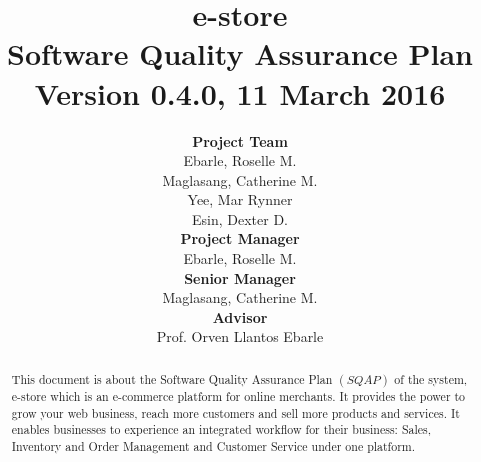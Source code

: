 \documentclass[12pt,letterpaper, margin=1in]{article}
\begin{document}
\title{\textbf{e-store}\\Software Quality Assurance Plan\\{\normalsize Version 0.4.0, 11 March 2016}\\[25pt]}
\author{
	\textbf{Project Team}\\
	Ebarle, Roselle M.\\
	Maglasang, Catherine M.\\
	Yee, Mar Rynner\\
	Esin, Dexter D.\\	[25pt]
	\textbf{Project Manager}\\
	Ebarle, Roselle M.\\[25pt]
	\textbf{Senior Manager}\\
	Maglasang, Catherine M.\\[25pt]
	\textbf{Advisor}\\
	Prof. Orven Llantos Ebarle\\[25pt]
}
\clearpage\maketitle
\thispagestyle{empty}

\newpage

\begin{abstract}
This document is about the Software Quality Assurance Plan $(SQAP)$ of the system, e-store which is an e-commerce platform for online merchants. It provides the power to grow your web business, reach more customers and sell more products and services. It enables businesses to experience an integrated workflow for their business: Sales, Inventory and Order Management and Customer Service under one platform.
\end{abstract}

\newpage 
\tableofcontents
\newpage 
\end{document}
